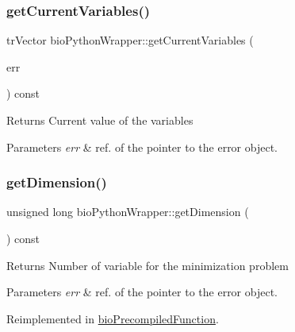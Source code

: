 \subsubsection{\texorpdfstring{get\+Current\+Variables()}{getCurrentVariables()}}
{\footnotesize\ttfamily tr\+Vector bio\+Python\+Wrapper\+::get\+Current\+Variables (\begin{DoxyParamCaption}\item[{pat\+Error $\ast$\&}]{err }\end{DoxyParamCaption}) const}

\begin{DoxyReturn}{Returns}
Current value of the variables 
\end{DoxyReturn}

\begin{DoxyParams}{Parameters}
{\em err} & ref. of the pointer to the error object. \\
\hline
\end{DoxyParams}
\mbox{\label{classbio_python_wrapper_a63991abdfaca07aca3757e96cd06410d}} 
\subsubsection{\texorpdfstring{get\+Dimension()}{getDimension()}}
{\footnotesize\ttfamily unsigned long bio\+Python\+Wrapper\+::get\+Dimension (\begin{DoxyParamCaption}{ }\end{DoxyParamCaption}) const\hspace{0.3cm}{\ttfamily [virtual]}}

\begin{DoxyReturn}{Returns}
Number of variable for the minimization problem 
\end{DoxyReturn}

\begin{DoxyParams}{Parameters}
{\em err} & ref. of the pointer to the error object. \\
\hline
\end{DoxyParams}


Reimplemented in \hyperlink{classbio_precompiled_function_a937016d0901997d9cc85b270335aa730}{bio\+Precompiled\+Function}.

\mbox{\label{classbio_python_wrapper_a1e8391dbed1fd49c04a042b9e15dec71}} 
